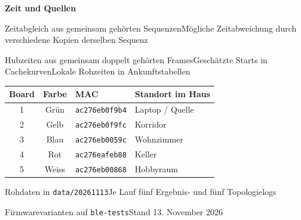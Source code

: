 \documentclass[a4paper,11pt]{article}
\begin{document}
\textbf{Zeit und Quellen}

{\small Zeitabgleich aus gemeinsam gehörten Sequenzen\enspace\textbullet\enspace Mögliche Zeitabweichung durch verschiedene Kopien derselben Sequenz\par
Hubzeiten aus gemeinsam doppelt gehörten Frames\enspace\textbullet\enspace Geschätzte Starts in Cachekurven\enspace\textbullet\enspace Lokale Rohzeiten in Ankunftstabellen}

\begin{center}\footnotesize
\begin{tabular}{ccll}\toprule
Board & Farbe & MAC & Standort im Haus \\ \midrule
1 & Grün & \texttt{ac276eb0f9b4} & Laptop / Quelle \\
2 & Gelb & \texttt{ac276eb0f9fc} & Korridor \\
3 & Blau & \texttt{ac276eb0059c} & Wohnzimmer \\
4 & Rot & \texttt{ac276eafeb88} & Keller \\
5 & Weiss & \texttt{ac276eb00868} & Hobbyraum \\
\bottomrule\end{tabular}\end{center}

{\small Rohdaten in \texttt{data/20261113}\enspace\textbullet\enspace Je Lauf fünf Ergebnis- und fünf Topologielogs\par
Firmwarevarianten auf \texttt{ble-tests}\enspace\textbullet\enspace Stand 13. November 2026}
\end{document}
